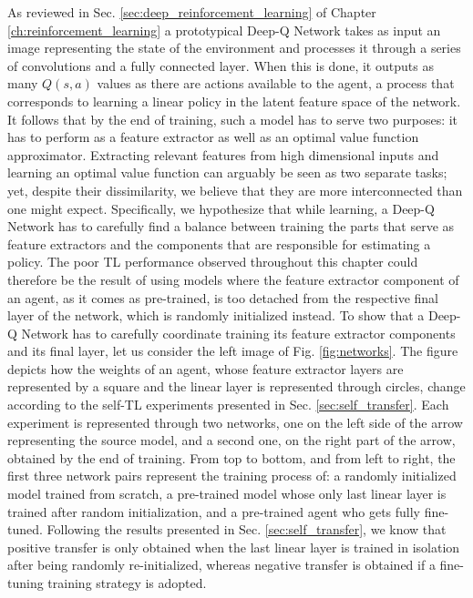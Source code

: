 As reviewed in Sec. \ref{sec:deep_reinforcement_learning} of Chapter \ref{ch:reinforcement_learning} a prototypical Deep-Q Network takes as input an image representing the state of the environment and processes it through a series of convolutions and a fully connected layer. When this is done, it outputs as many $Q(s,a)$ values as there are actions available to the agent, a process that corresponds to learning a linear policy in the latent feature space of the network. It follows that by the end of training, such a model has to serve two purposes: it has to perform as a feature extractor as well as an optimal value function approximator.
Extracting relevant features from high dimensional inputs and learning an optimal value function can arguably be seen as two separate tasks; yet, despite their dissimilarity, we believe that they are more interconnected than one might expect. Specifically, we hypothesize that while learning, a Deep-Q Network has to carefully find a balance between training the parts that serve as feature extractors and the components that are responsible for estimating a policy. The poor TL performance observed throughout this chapter could therefore be the result of using models where the feature extractor component of an agent, as it comes as pre-trained, is too detached from the respective final layer of the network, which is randomly initialized instead.   
To show that a Deep-Q Network has to carefully coordinate training its feature extractor components and its final layer, let us consider the left image of Fig. \ref{fig:networks}. The figure depicts how the weights of an agent, whose feature extractor layers are represented by a square and the linear layer is represented through circles, change according to the self-TL experiments presented in Sec. \ref{sec:self_transfer}. Each experiment is represented through two networks, one on the left side of the arrow representing the source model, and a second one, on the right part of the arrow, obtained by the end of training. From top to bottom, and from left to right, the first three network pairs represent the training process of: a randomly initialized model trained from scratch, a pre-trained model whose only last linear layer is trained after random initialization, and a pre-trained agent who gets fully fine-tuned. Following the results presented in Sec. \ref{sec:self_transfer}, we know that positive transfer is only obtained when the last linear layer is trained in isolation after being randomly re-initialized, whereas negative transfer is obtained if a fine-tuning training strategy is adopted.  

